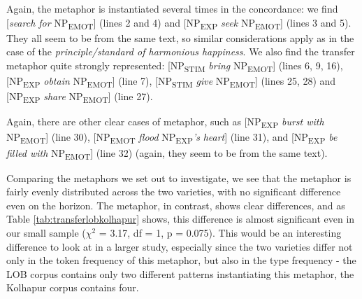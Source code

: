 Again, the  metaphor is instantiated several times in the concordance: we find [\textit{search for} NP\textsubscript{EMOT}] (lines 2 and 4) and [NP\textsubscript{EXP} \textit{seek} NP\textsubscript{EMOT}] (lines 3 and 5). They all seem to be from the same text, so similar considerations apply as in the case of the \textit{principle/standard of harmonious happiness}. We also find the transfer metaphor quite strongly represented: [NP\textsubscript{STIM} \textit{bring} NP\textsubscript{EMOT}] (lines 6, 9, 16), [NP\textsubscript{EXP} \textit{obtain} NP\textsubscript{EMOT}] (line 7), [NP\textsubscript{STIM} \textit{give} NP\textsubscript{EMOT}] (lines 25, 28) and [NP\textsubscript{EXP} \textit{share} NP\textsubscript{EMOT}] (line 27).

Again, there are other clear cases of metaphor, such as [NP\textsubscript{EXP} \textit{burst with} NP\textsubscript{EMOT}] (line 30), [NP\textsubscript{EMOT} \textit{flood} NP\textsubscript{EXP}\textit{'s} \textit{heart}] (line 31), and [NP\textsubscript{EXP} \textit{be filled with} NP\textsubscript{EMOT}] (line 32) (again, they seem to be from the same text).

Comparing the metaphors we set out to investigate, we see that the  metaphor is fairly evenly distributed across the two varieties, with no significant difference even on the horizon. The  metaphor, in contrast, shows clear differences, and as Table \ref{tab:transferlobkolhapur} shows, this difference is almost significant even in our small sample ($\chi^2$ = 3.17, df = 1, p = 0.075). This would be an interesting difference to look at in a larger study, especially since the two varieties differ not only in the token frequency of this metaphor, but also in the type frequency - the LOB corpus contains only two different patterns instantiating this metaphor, the Kolhapur corpus contains four.

